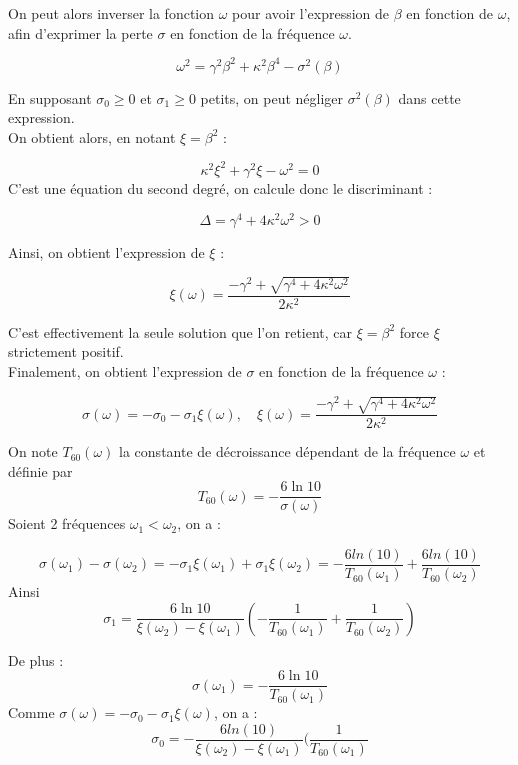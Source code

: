 \documentclass[a4,12pt]{article}
\begin{document}
	    On peut alors inverser la fonction $\omega$ pour avoir l'expression de $\beta$ en fonction de $\omega$, afin d'exprimer la perte $\sigma$ en fonction de la fréquence $\omega$.

	    \[
	      \omega^2 = \gamma^2 \beta^2 + \kappa^2 \beta^4 - \sigma^2(\beta)
	    \]

	    En supposant $\sigma_0\geqslant 0$ et $\sigma_1\geqslant 0$ petits, on peut négliger $\sigma^2(\beta)$ dans cette expression.\\
	    On obtient alors, en notant $\xi = \beta^2$ :

	    \[
	      \kappa^2 \xi^2 + \gamma^2 \xi - \omega^2 = 0
	    \]
	    C'est une équation du second degré, on calcule donc le discriminant :

	    \[
	      \Delta = \gamma^4 + 4 \kappa^2 \omega^2 > 0
	    \]

	    Ainsi, on obtient l'expression de $\xi$ :

	    \[
	      \xi(\omega) = \frac{-\gamma^2+\sqrt{\gamma^4+4\kappa^2 \omega^2}}{2\kappa^2}
	    \]

	    C'est effectivement la seule solution que l'on retient, car $\xi = \beta^2$ force $\xi$ strictement positif.\\

	    Finalement, on obtient l'expression de $\sigma$ en fonction de la fréquence $\omega$ :

	    \[
	      \sigma(\omega)=-\sigma_0-\sigma_1\xi (\omega),\quad \xi(\omega)=\frac{-\gamma^2+\sqrt{\gamma^4+4\kappa^2 \omega^2}}{2\kappa^2}
	    \]

	    On note $T_{60}(\omega)$ la constante de décroissance dépendant de la fréquence $\omega$ et définie par 
	    \[
	      T_{60}(\omega)=-\frac{6\ln 10}{\sigma(\omega)}
	    \]
	    Soient 2 fréquences $\omega_1<\omega_2$, on a :

	    \[
	      \sigma(\omega_1)-\sigma(\omega_2) = -\sigma_1 \xi(\omega_1) + \sigma_1 \xi(\omega_2)
	      = -\frac{6 ln(10)}{T_{60}(\omega_1)} + \frac{6 ln(10)}{T_{60}(\omega_2)}
	    \]
	    Ainsi \[
	      \sigma_1=\frac{6 \ln 10}{\xi(\omega_2)-\xi(\omega_1)}\left(-\frac{1}{T_{60}(\omega_1)}+\frac{1}{T_{60}(\omega_2)}\right)
	    \]

	    De plus :
	    \[
	      \sigma(\omega_1)=-\frac{6\ln 10}{T_{60}(\omega_1)}
	    \]
	    Comme $\sigma(\omega)=-\sigma_0-\sigma_1\xi (\omega)$, on a :
	    \[
	      \sigma_0 = - \frac{6 ln(10)}{\xi(\omega_2)-\xi(\omega_1)} (\frac{1}{T_{60}(\omega_1)}
	    \]
\end{document}

